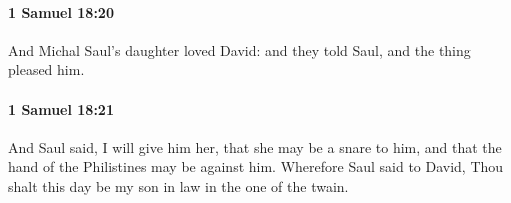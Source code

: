 		\paragraph{1 Samuel 18:20} %
			\label{1SAMUEL-18-20}

			And Michal Saul’s daughter loved David: and they told Saul, and the thing pleased him.


		\paragraph{1 Samuel 18:21} %
			\label{1SAMUEL-18-21}

			And Saul said, I will give him her, that she may be a snare to him, and that the hand of the Philistines may be against him. Wherefore Saul said to David, Thou shalt this day be my son in law in the one of the twain.


